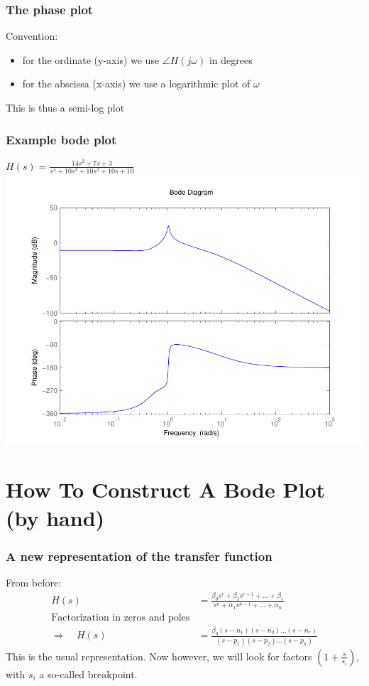 \begin{frame}
\frametitle{The phase plot}
Convention:
\begin{itemize}
\item for the ordinate (y-axis) we use $\angle H(j\omega)$ in degrees
\item for the abscissa (x-axis) we use a logarithmic plot of $\omega$

\end{itemize}
This is thus a semi-log plot


\end{frame}


\begin{frame}
\frametitle{Example bode plot}
$H(s) = \frac{14s^2 + 7s + 3}{s^4 + 10s^3 + 10s^2 + 10s + 10}$
\includegraphics[scale=0.5]{ExampleBode1}


\end{frame}


\section{How To Construct A Bode Plot (by hand)}

\begin{frame}
\frametitle{A new representation of the transfer function}
From before:
\begin{align*}
H(s) &= \frac{\beta_0 s^r + \beta_1 s^{r-1} + \ldots + \beta_r}{s^n + \alpha_1 s^{n-1} + \ldots + \alpha_n}\\
\text{Factorization in zeros and poles}\\
\Rightarrow \quad
H(s) &= \frac{\beta_0 (s-n_1) (s-n_2) \ldots (s-n_r)}{(s-p_1) (s-p_2) \ldots (s-p_n)}
\end{align*}
This is the usual representation. Now however, we will look for factors $(1+\displaystyle{\frac{s}{s_i}})$, with $s_i$ a so-called breakpoint.


\end{frame}


